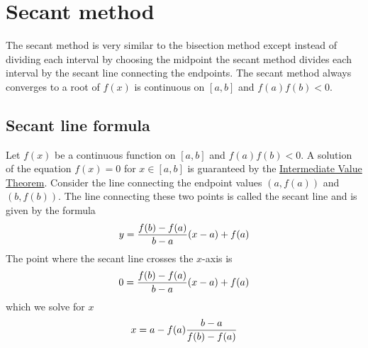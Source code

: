 \documentclass[a4paper, 12pt, reqno]{article}
\begin{document}
\section{Secant method}
The secant method is very similar to the bisection method except instead of dividing each interval by choosing the midpoint the secant method divides each interval by the secant line connecting the endpoints. The secant method always converges to a root of $f(x)$ is continuous on $[a,b]$ and $f(a)f(b)<0$.

\subsection{Secant line formula}
Let $f(x)$ be a continuous function on $[a,b]$ and $f(a)f(b)<0$. A solution of the equation $f(x) = 0$ for $x \in [a,b]$ is guaranteed by the \underline{Intermediate Value} \underline{Theorem}. Consider the line connecting the endpoint values $(a,f(a))$ and $(b,f(b))$. The line connecting these two points is called the secant line and is given by the formula
\begin{equation}
y = \frac{f(b) - f(a)}{b - a}(x - a) + f(a)
\notag
\end{equation}
The point where the secant line crosses the $x$-axis is
\begin{equation}
0 = \frac{f(b) - f(a)}{b - a}(x - a) + f(a)
\notag
\end{equation}
which we solve for $x$
\begin{equation}
x = a - f(a)\frac{b - a}{f(b) - f(a)}
\notag
\end{equation}
\end{document}
